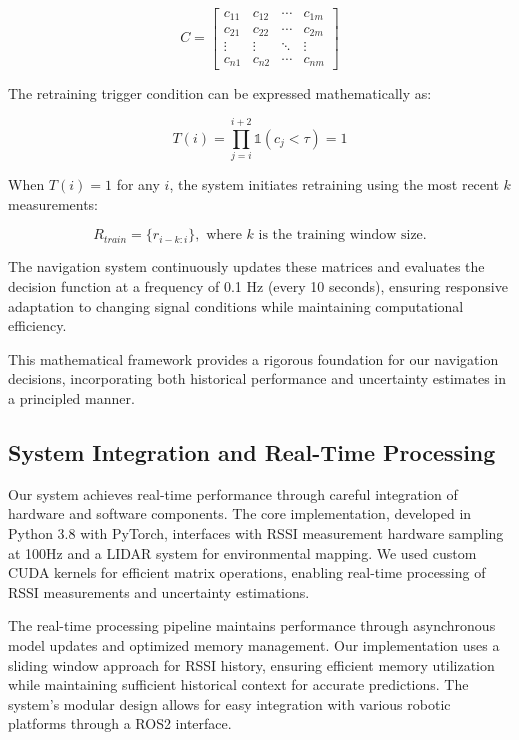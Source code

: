 \documentclass[12pt]{article}
\begin{document}
\[
C = 
\begin{bmatrix}
c_{11} & c_{12} & \cdots & c_{1m} \\
c_{21} & c_{22} & \cdots & c_{2m} \\
\vdots & \vdots & \ddots & \vdots \\
c_{n1} & c_{n2} & \cdots & c_{nm}
\end{bmatrix}
\]

The retraining trigger condition can be expressed mathematically as:

\[
T(i) = \prod_{j=i}^{i+2} \mathbb{1}(c_j < \tau) = 1
\]

When \( T(i) = 1 \) for any \( i \), the system initiates retraining using the most recent \( k \) measurements:

\[
R_{train} = \{r_{i-k:i}\}, \text{ where } k \text{ is the training window size.}
\]

The navigation system continuously updates these matrices and evaluates the decision function at a frequency of 0.1 Hz (every 10 seconds), ensuring responsive adaptation to changing signal conditions while maintaining computational efficiency.

This mathematical framework provides a rigorous foundation for our navigation decisions, incorporating both historical performance and uncertainty estimates in a principled manner.



\subsection{System Integration and Real-Time Processing}

Our system achieves real-time performance through careful integration of hardware and software components. The core implementation, developed in Python 3.8 with PyTorch, interfaces with RSSI measurement hardware sampling at 100Hz and a LIDAR system for environmental mapping. We used custom CUDA kernels for efficient matrix operations, enabling real-time processing of RSSI measurements and uncertainty estimations.

The real-time processing pipeline maintains performance through asynchronous model updates and optimized memory management. Our implementation uses a sliding window approach for RSSI history, ensuring efficient memory utilization while maintaining sufficient historical context for accurate predictions. The system's modular design allows for easy integration with various robotic platforms through a ROS2 interface.
\end{document}
